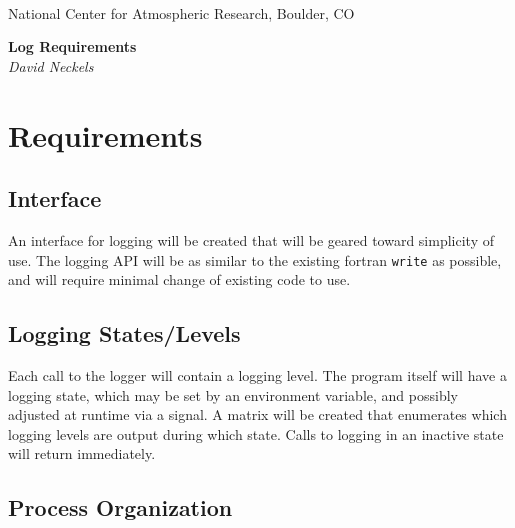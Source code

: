 \documentclass[]{article}
\begin{document}

\begin{titlepage}

\begin{latexonly}
 \\
\noindent National Center for Atmospheric Research, Boulder, CO \\
\vspace{2in}
\end{latexonly}

\begin{center}
{\Large\bf Log Requirements} \\
\medskip
{\it David Neckels }
\end{center}

\end{titlepage}

\tableofcontents

\newpage


\section{Requirements}

\subsection{Interface}

An interface for logging will be created that will be geared toward 
simplicity of use.  
The logging API will be as similar to the existing fortran {\tt write} as
possible, and will require minimal change of existing code to use.

\subsection{Logging States/Levels}
Each call to the logger will contain a logging
level.  The program itself will have a logging state, which may be set by an
environment variable, and possibly adjusted at runtime via a signal.
A matrix will be created that enumerates which logging levels are output during 
which state.  Calls to logging in an inactive state will return immediately.

\subsection{Process Organization}
\end{document}
